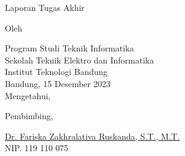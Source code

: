 \clearpage
\pagestyle{empty}

\begin{center}
    \smallskip
    
    \Large \bfseries \MakeUppercase{\thetitle}
    \vfill
    
    \Large Laporan Tugas Akhir
    \vfill
    
    \large Oleh
    
    \Large \theauthor
    
    \large Program Studi Teknik Informatika \\
    
    \normalsize \normalfont
    Sekolah Teknik Elektro dan Informatika \\
    Institut Teknologi Bandung \\
    
    \vfill
    \normalsize \normalfont
    Bandung, 15 Desember 2023 \\
    Mengetahui,
    
    \vspace{0.5cm}
    Pembimbing,
    
    \vfill
    \underline{Dr. Fariska Zakhralativa Ruskanda, S.T., M.T.} \\
    NIP. 119 110 075
    
\end{center}
\clearpage
